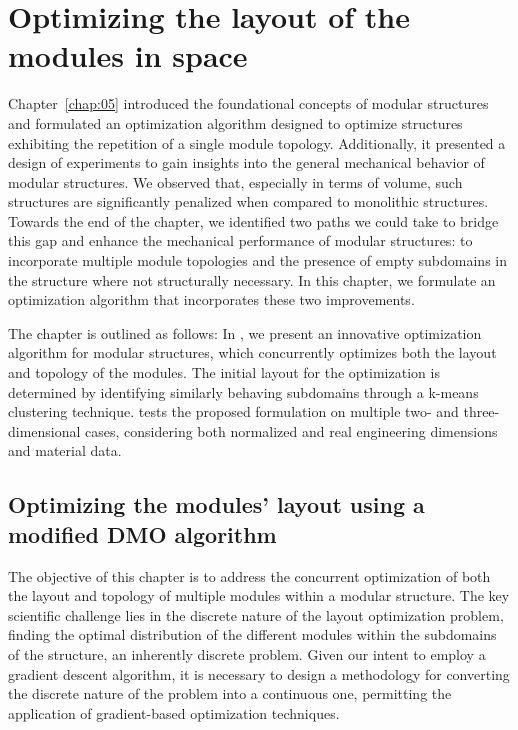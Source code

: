 \setchapterpreamble[u]{\margintoc}
\glsresetall %
\chapter{Optimizing the layout of the modules in space} \label{chap:06}
Chapter~\ref{chap:05} introduced the foundational concepts of modular structures and formulated an optimization algorithm designed to optimize structures exhibiting the repetition of a single module topology. Additionally, it presented a design of experiments to gain insights into the general mechanical behavior of modular structures. We observed that, especially in terms of volume, such structures are significantly penalized when compared to monolithic structures. Towards the end of the chapter, we identified two paths we could take to bridge this gap and enhance the mechanical performance of modular structures: to incorporate multiple module topologies and the presence of empty subdomains in the structure where not structurally necessary. In this chapter, we formulate an optimization algorithm that incorporates these two improvements.

The chapter is outlined as follows: In , we present an innovative optimization algorithm for modular structures, which concurrently optimizes both the layout and topology of the modules. The initial layout for the optimization is determined by identifying similarly behaving subdomains through a k-means clustering technique.  tests the proposed formulation on multiple two- and three-dimensional cases, considering both normalized and real engineering dimensions and material data.

\section{Optimizing the modules' layout using a modified DMO algorithm} \label{sec:06_opt}
The objective of this chapter is to address the concurrent optimization of both the layout and topology of multiple modules within a modular structure. The key scientific challenge lies in the discrete nature of the layout optimization problem, \ie finding the optimal distribution of the different modules within the subdomains of the structure, an inherently discrete problem. Given our intent to employ a gradient descent algorithm, it is necessary to design a methodology for converting the discrete nature of the problem into a continuous one, permitting the application of gradient-based optimization techniques.

